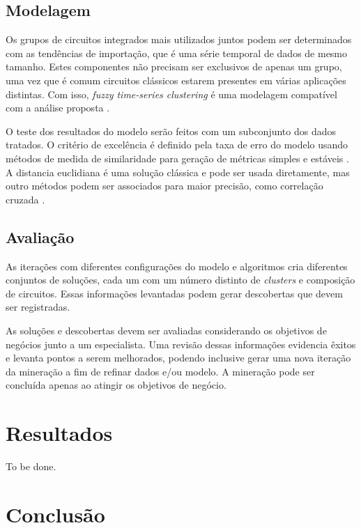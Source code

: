 \documentclass[conference,compsoc]{IEEEtran}
\begin{document}
\subsection{Modelagem}

Os grupos de circuitos integrados mais utilizados juntos podem ser determinados com as tendências de importação, que é uma série temporal de dados de mesmo tamanho. Estes componentes não precisam ser exclusivos de apenas um grupo, uma vez que é comum circuitos clássicos estarem presentes em várias aplicações distintas. Com isso, \textit{fuzzy time-series clustering} é uma modelagem compatível com a análise proposta \cite{reviewcluster}.

O teste dos resultados do modelo serão feitos com um subconjunto dos dados tratados. O critério de excelência é definido pela taxa de erro do modelo usando métodos de medida de similaridade para geração de métricas simples e estáveis \cite{reviewcluster}. A distancia euclidiana é uma solução clássica e pode ser usada diretamente, mas outro métodos podem ser associados para maior precisão, como correlação cruzada \cite{liaosurvey}.

\subsection{Avaliação}

As iterações com diferentes configurações do modelo e algoritmos cria diferentes conjuntos de soluções, cada um com um número distinto de \textit{clusters} e composição de circuitos. Essas informações levantadas podem gerar descobertas que devem ser registradas.

As soluções e descobertas devem ser avaliadas considerando os objetivos de negócios junto a um especialista. Uma revisão dessas informações evidencia êxitos e levanta pontos a serem melhorados, podendo inclusive gerar uma nova iteração da mineração a fim de refinar dados e/ou modelo. A mineração pode ser concluída apenas ao atingir os objetivos de negócio.

\section{Resultados}\label{sec_result}

To be done.

\section{Conclusão} \label{sec_concl}
\end{document}
